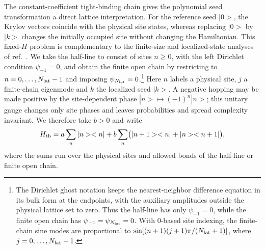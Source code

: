 \documentclass[a4paper,11pt]{article}
\def\ket#1{|#1>}%
\def\bra#1{<#1|}%
\theoremstyle{definition}
\theoremstyle{remark}
\newcommand{\ket}[1]{|#1\rangle}
\newcommand{\bra}[1]{\langle #1|}
\begin{document}
The constant-coefficient tight-binding chain gives the polynomial seed transformation a direct lattice interpretation. For the reference seed \(\ket0\), the Krylov vectors coincide with the physical site states, whereas replacing \(\ket0\) by \(\ket k\) changes the initially occupied site without changing the Hamiltonian. This fixed-$H$ problem is complementary to the finite-size and localized-state analyses of ref.~\cite{Balasubramanian:2025variations}. We take the half-line to consist of sites \(n\ge0\), with the left Dirichlet condition \(\psi_{-1}=0\), and obtain the finite open chain by restricting to \(n=0,\ldots,N_{\rm lat}-1\) and imposing \(\psi_{N_{\rm lat}}=0\).\footnote{The Dirichlet ghost notation keeps the nearest-neighbor difference equation in its bulk form at the endpoints, with the auxiliary amplitudes outside the physical lattice set to zero. Thus the half-line has only \(\psi_{-1}=0\), while the finite open chain has \(\psi_{-1}=\psi_{N_{\rm lat}}=0\). With \(0\)-based site indexing, the finite-chain sine modes are proportional to \(\sin[(n+1)(j+1)\pi/(N_{\rm lat}+1)]\), where \(j=0,\ldots,N_{\rm lat}-1\).} Here \(n\) labels a physical site, \(j\) a finite-chain eigenmode and \(k\) the localized seed \(\ket k\). A negative hopping may be made positive by the site-dependent phase \(\ket n\mapsto(-1)^n\ket n\); this unitary gauge changes only site phases and leaves probabilities and spread complexity invariant. We therefore take \(b>0\) and write
\begin{equation}
   H_{\rm tb}=a\sum_n\ket n\bra n
   +b\sum_n\bigl(\ket{n+1}\bra n+\ket n\bra{n+1}\bigr),
   \label{eq:tight-binding-main}
\end{equation}
where the sums run over the physical sites and allowed bonds of the half-line or finite open chain.
\end{document}
